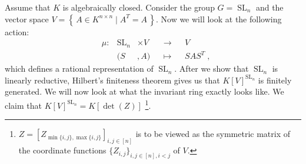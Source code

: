 \begin{dexample}\label{quad}
  Assume that $K$ is algebraically closed.
  Consider the group $G = \operatorname{SL}_n$ and the vector space $ V = \left\{ \, A \in K^{n \times n} \mid A^T = A \, \right\} $.
  Now we will look at the following action:
  \begin{equation*}
    \begin{aligned}
      &\mu \colon & \operatorname{SL}_n &\times  V&&  \longrightarrow  &&V \\
      && (  S  &,   A  )  &&\longmapsto&&  SAS^T \; ,
    \end{aligned}
  \end{equation*}
  which defines a rational representation of $\operatorname{SL}_n$.
  After we show that $\operatorname{SL}_n$ is linearly reductive, Hilbert's finiteness theorem gives us that $K[V]^{\operatorname{SL}_n}$ is finitely generated.
  We will now look at what the invariant ring exactly looks like.
  We claim that $K[V]^{\operatorname{SL}_n} = K[\operatorname{det}(Z)]$ \footnote{$Z = [Z_{\operatorname{min}\{i,j\},\operatorname{max}\{i,j\}}]_{i,j \in [n]}$ is to be viewed as the symmetric matrix of the coordinate functions $\{Z_{i,j}\}_{i,j \in[n],i<j}$ of $V$.}.
\end{dexample}
